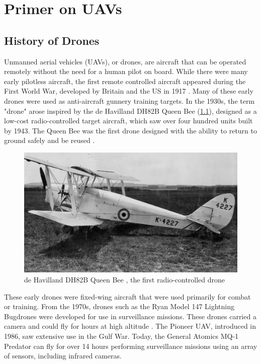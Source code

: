 \chapter{Primer on UAVs}

\section{History of Drones}
\label{sec:drone-history}

Unmanned aerial vehicles (UAVs), or drones, are aircraft that can be operated
remotely without the need for a human pilot on board. While there were many
early pilotless aircraft, the first remote controlled aircraft appeared during
the First World War, developed by Britain and the US in 1917
\cite{dronehistory}. Many of these early drones were used as anti-aircraft
gunnery training targets. In the 1930s, the term "drone" arose inspired by the
de Havilland DH82B Queen Bee (\cref{fig:queen-bee}), designed as a low-cost
radio-controlled target aircraft, which saw over four hundred units built by
1943. The Queen Bee was the first drone designed with the ability to return to
ground safely and be reused \cite{queenbee, pbs05}.

\begin{figure}[htbp]
\centerline{\includegraphics[width = .6\textwidth]{figs/queenbee.png}}
\caption{de Havilland DH82B Queen Bee \cite{baesystems}, the first radio-controlled drone}
\label{fig:queen-bee}
\end{figure}

These early drones were fixed-wing aircraft that were used primarily for combat
or training. From the 1970s, drones such as the Ryan Model 147 Lightning
Bugdrones were developed for use in surveillance missions. These drones carried
a camera and could fly for hours at high altitude \cite{pbs12}. The Pioneer
UAV, introduced in 1986, saw extensive use in the Gulf War. Today, the General
Atomics MQ-1 Predator can fly for over 14 hours performing surveillance
missions using an array of sensors, including infrared cameras.

